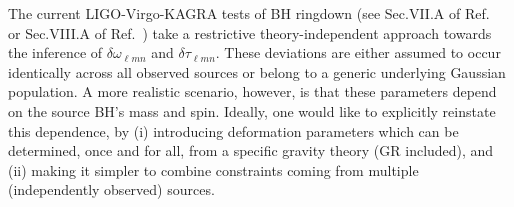 \documentclass[twocolumn,
               prd,
               aps,
               superscriptaddress,
               tightenlines,
               nofootinbib,
               eqsecnum,
               amsfonts,
               amsmath,
               longbibliography]{revtex4-1}
\begin{document}
The current LIGO-Virgo-KAGRA tests of BH ringdown (see Sec.VII.A
of Ref.~\cite{LIGOScientific:2020tif} or Sec.VIII.A
of Ref.~\cite{LIGOScientific:2021sio}) take a restrictive theory-independent
approach towards the inference of $\delta\omega_{\ell m n}$ and
$\delta\tau_{\ell m n}$. These deviations are either assumed to occur
identically across all observed sources or belong to a generic
underlying Gaussian population. A more realistic scenario, however, is
that these parameters depend on the source BH's mass and spin.
%
Ideally, one would like to explicitly reinstate this dependence, by
%
(i) introducing deformation parameters which can be determined, once and for
all, from a specific gravity theory (GR included), and
%
(ii) making it simpler to combine constraints coming from multiple (independently observed) sources.
\end{document}

